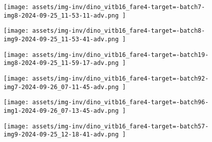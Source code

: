 \begin{figure*}[t]
    \vspace{1mm}
    \begin{minipage}[t]{.025\textwidth}
         \vspace{9mm}
    \end{minipage}%
    \begin{minipage}[t]{.98\textwidth}
        \vspace{0pt}
            \begin{subfigure}[t]{0.16\textwidth}
                    \texttt{[image:  assets/img-inv/dino\_vitb16\_fare4-target=-batch7-img8-2024-09-25\_11-53-11-adv.png ]}
            \end{subfigure}%
                \hspace{0.5mm}%
            \begin{subfigure}[t]{0.16\textwidth}
                    \texttt{[image:  assets/img-inv/dino\_vitb16\_fare4-target=-batch8-img9-2024-09-25\_11-53-41-adv.png ]}
            \end{subfigure}%
                \hspace{0.5mm}%
            \begin{subfigure}[t]{0.16\textwidth}
                    \texttt{[image:  assets/img-inv/dino\_vitb16\_fare4-target=-batch19-img8-2024-09-25\_11-59-17-adv.png ]}
            \end{subfigure}%
                \hspace{0.5mm}%
            \begin{subfigure}[t]{0.16\textwidth}
                    \texttt{[image:  assets/img-inv/dino\_vitb16\_fare4-target=-batch92-img7-2024-09-26\_07-11-45-adv.png ]}
            \end{subfigure}%
                \hspace{0.5mm}%
            \begin{subfigure}[t]{0.16\textwidth}
                    \texttt{[image:  assets/img-inv/dino\_vitb16\_fare4-target=-batch96-img1-2024-09-26\_07-13-45-adv.png ]}
            \end{subfigure}%
                \hspace{0.5mm}%
            \begin{subfigure}[t]{0.16\textwidth}
                    \texttt{[image:  assets/img-inv/dino\_vitb16\_fare4-target=-batch57-img9-2024-09-25\_12-18-41-adv.png ]}
            \end{subfigure}%
    \end{minipage}


\end{figure*}

